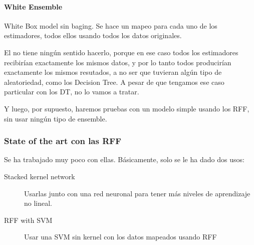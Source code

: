   \paragraph{White Ensemble}
  White Box model sin baging. Se hace un mapeo para cada uno de los estimadores,
  todos ellos usando todos los datos originales.


  El  no tiene ningún sentido hacerlo, porque en ese caso
  todos los estimadores recibirían exactamente los mismos datos, y por lo tanto
  todos producirían exactamente los mismos resutados, a no ser que tuvieran algún
  tipo de aleatoriedad, como los Decision Tree. A pesar de que tengamos ese caso
  particular con los DT, no lo vamos a tratar.

  Y luego, por supuesto, haremos pruebas con un modelo simple usando los RFF, sin
  usar ningún tipo de ensemble.

\begin{note}
  \subsubsection{State of the art con las RFF}

  Se ha trabajado muy poco con ellas. Básicamente, solo se le ha dado
  dos usos:
  \begin{description}
    \item[Stacked kernel network] \cite{stacked_kernel_network} Usarlas junto
    con una red neuronal para tener más niveles de aprendizaje no lineal.
    \item[RFF with SVM] \cite{svm_rff} Usar una SVM sin kernel con los datos
    mapeados usando RFF
  \end{description}
\end{note}
